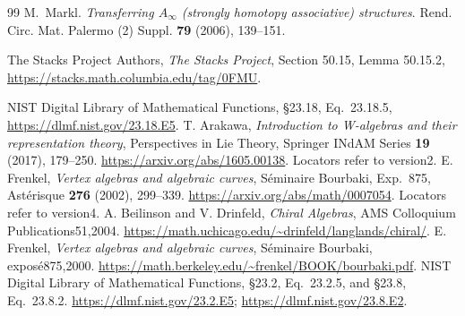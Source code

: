 \begin{thebibliography}{99}
M.~Markl.
\textit{Transferring $A_\infty$ (strongly homotopy associative)
structures}.
Rend. Circ. Mat. Palermo (2) Suppl. \textbf{79} (2006), 139--151.

The Stacks Project Authors, \emph{The Stacks Project},
Section 50.15, Lemma 50.15.2,
\url{https://stacks.math.columbia.edu/tag/0FMU}.

 NIST Digital Library of Mathematical Functions, \S23.18, Eq.~23.18.5, \url{https://dlmf.nist.gov/23.18.E5}.
 T. Arakawa, \emph{Introduction to W-algebras and their representation theory}, Perspectives in Lie Theory, Springer INdAM Series \textbf{19} (2017), 179--250. \url{https://arxiv.org/abs/1605.00138}. Locators refer to version2.
 E. Frenkel, \emph{Vertex algebras and algebraic curves}, S\'eminaire Bourbaki, Exp.~875, Ast\'erisque \textbf{276} (2002), 299--339. \url{https://arxiv.org/abs/math/0007054}. Locators refer to version4.
 A. Beilinson and V. Drinfeld, \emph{Chiral Algebras}, AMS Colloquium Publications51,2004. \url{https://math.uchicago.edu/~drinfeld/langlands/chiral/}.
 E. Frenkel, \emph{Vertex algebras and algebraic curves}, S\'eminaire Bourbaki, expos\'e875,2000. \url{https://math.berkeley.edu/~frenkel/BOOK/bourbaki.pdf}.
 NIST Digital Library of Mathematical Functions, \S23.2, Eq.~23.2.5, and \S23.8, Eq.~23.8.2. \url{https://dlmf.nist.gov/23.2.E5}; \url{https://dlmf.nist.gov/23.8.E2}.
\end{thebibliography}
